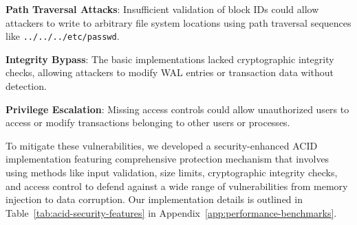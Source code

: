 \documentclass[conference]{IEEEtran}
\begin{document}
\begin{itemize}[leftmargin=*]
\textbf{Path Traversal Attacks}:
Insufficient validation of block IDs could allow attackers to write to arbitrary file system locations using path traversal sequences like \texttt{../../../etc/passwd}.

\textbf{Integrity Bypass}:
The basic implementations lacked cryptographic integrity checks, allowing attackers to modify WAL entries or transaction data without detection.

\textbf{Privilege Escalation}:
Missing access controls could allow unauthorized users to access or modify transactions belonging to other users or processes.

To mitigate these vulnerabilities, we developed a security-enhanced ACID implementation featuring comprehensive protection mechanism that involves using methods like input validation, size limits, cryptographic integrity checks, and access control to defend against a wide range of vulnerabilities from memory injection to data corruption.
Our implementation details is outlined in Table~\ref{tab:acid-security-features} in Appendix~\ref{app:performance-benchmarks}.



\end{itemize}
\end{document}
